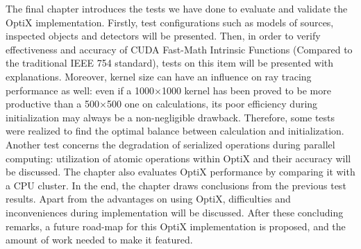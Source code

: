 The final chapter introduces the tests we have done to evaluate and validate the OptiX implementation. Firstly, test configurations such as models of sources, inspected objects and detectors will be presented. Then, in order to verify effectiveness and accuracy of CUDA Fast-Math Intrinsic Functions (Compared to the traditional IEEE 754 standard), tests on this item will be presented with explanations. Moreover, kernel size can have an influence on ray tracing performance as well: even if a 1000$\times$1000 kernel has been proved to be more productive than a 500$\times$500 one on calculations, its poor efficiency during initialization may always be a non-negligible drawback. Therefore, some tests were realized to find the optimal balance between calculation and initialization. Another test concerns the degradation of serialized operations during parallel computing: utilization of atomic operations within OptiX and their accuracy will be discussed. The chapter also evaluates OptiX performance by comparing it with a CPU cluster. In the end, the chapter draws conclusions from the previous test results. Apart from the advantages on using OptiX, difficulties and inconveniences during implementation will be discussed. After these concluding remarks, a future road-map for this OptiX implementation is proposed, and the amount of work needed to make it featured.
